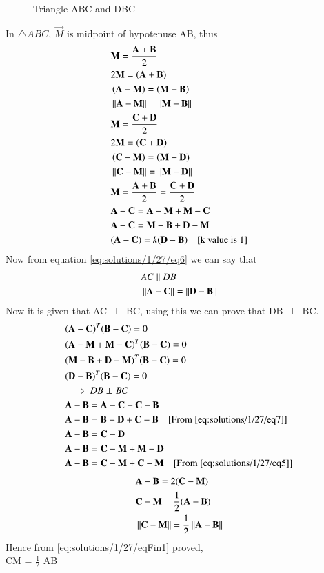 \begin{figure}[!ht]
\centering
\resizebox{\columnwidth}{!}{}
\caption{Triangle ABC and DBC}
\label{eq:solutions/1/27/myfig}
\end{figure}
In $\triangle{ABC}$, $\vec{M}$ is midpoint of hypotenuse AB, thus 
\begin{align}
&\vec{M} = \frac{\vec{A}+\vec{B}}{2}\label{eq:solutions/1/27/eq1} \\
&2\vec{M} = \brak{\vec{A+B}}\\
&\brak{\vec{A-M}} = \brak{\vec{M-B}}\\
&\norm{\vec{A}-\vec{M}}=\norm{\vec{M}-\vec{B}}\label{eq:solutions/1/27/eq4} \\
&\vec{M} = \frac{\vec{C}+\vec{D}}{2}\label{eq:solutions/1/27/eq2} \\
&2\vec{M} = \brak{\vec{C+D}}\\
&\brak{\vec{C-M}} = \brak{\vec{M-D}}\\
&\norm{\vec{C}-\vec{M}}=\norm{\vec{M}-\vec{D}}\label{eq:solutions/1/27/eq5} \\
&\vec{M} = \frac{\vec{A}+\vec{B}}{2} = \frac{\vec{C}+\vec{D}}{2}\label{eq:solutions/1/27/eq3} \\
&\vec{A - C} = \vec{A - M} + \vec{M - C} \\
&\vec{A - C} = \vec{M - B} + \vec{D - M} \\
&(\vec{A - C}) = k(\vec{D - B})\label{eq:solutions/1/27/eq6} \quad\text{[k value is 1]}
\end{align} 
Now from equation \eqref{eq:solutions/1/27/eq6} we can say that 
\begin{align}
&AC \parallel DB\label{eq:solutions/1/27/eq8} \\
&\norm{\vec{A - C}} = \norm{\vec{D - B}}\label{eq:solutions/1/27/eq7} 
\end{align}
Now it is given that AC $\perp$ BC, using this we can prove that DB $\perp$ BC. 
\begin{align}
&(\vec A -\vec C)^T(\vec{B}-\vec{C}) = 0 \\
&(\vec A -\vec M +\vec M -\vec C)^T(\vec{B}-\vec{C}) = 0 \\
&(\vec M -\vec B +\vec D -\vec M)^T(\vec{B}-\vec{C}) = 0 \\
&(\vec D -\vec B)^T(\vec{B}-\vec{C}) = 0 \\
&\implies DB \perp BC \\
&\vec{A - B} = \vec{A - C}+\vec{C - B} \\
&\vec{A - B} = \vec{B - D}+\vec{C - B} \quad\text{[From \eqref{eq:solutions/1/27/eq7}]} \\
&\vec{A - B} = \vec{C - D} \\
&\vec{A - B} = \vec{C - M}+ \vec{M - D} \\
&\vec{A - B} = \vec{C - M}+\vec{C - M} \quad\text{[From \eqref{eq:solutions/1/27/eq5}]}
\end{align} 
\begin{align}
&\vec{A - B} = 2 (\vec{C - M}) \\
&\vec{C - M} = \frac{1}{2}(\vec{A - B}) \\
&\norm{\vec{C - M}} = \frac{1}{2}\norm{\vec{A - B}}\label{eq:solutions/1/27/eqFin1}
\end{align}
Hence from \eqref{eq:solutions/1/27/eqFin1} proved,\\CM = $\frac{1}{2}$ AB
